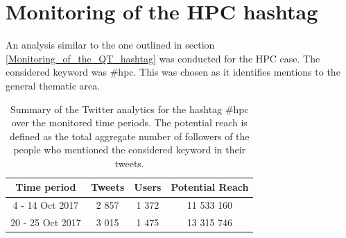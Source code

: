 \section{Monitoring of the HPC hashtag} \label{Monitoring_of_the_HPC_hashtag}
An analysis similar to the one outlined in section \ref{Monitoring_of_the_QT_hashtag} was conducted for the HPC case. The considered keyword was \#hpc. This was chosen as it identifies mentions to the general thematic area.

\begin{table}[t]
 \begin{center}
  \begin{tabular}{cccc}
   \hline 
   \hline
   Time period & Tweets & Users & Potential Reach \\ 
   \hline
   \hline
   4 - 14 Oct 2017 & 2 857 & 1 372 & 11 533 160  \\
   20 - 25 Oct 2017 & 3 015 & 1 475 & 13 315 746  \\
   \hline
   \hline
  \end{tabular}
 \end{center} 
 \caption{Summary of the Twitter analytics for the hashtag \#hpc over the monitored time periods. The potential reach is defined as the total aggregate number of followers of the people who mentioned the considered keyword in their tweets.}
\label{Summary_HPC} 
\end{table}

